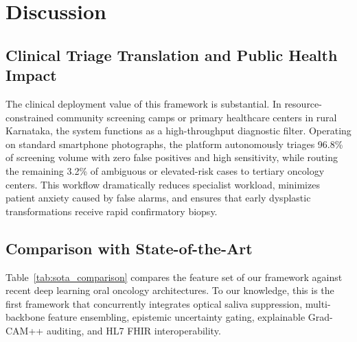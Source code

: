 \documentclass[journal]{IEEEtran}
\begin{document}
\section{Discussion}

\subsection{Clinical Triage Translation and Public Health Impact}
The clinical deployment value of this framework is substantial. In resource-constrained community screening camps or primary healthcare centers in rural Karnataka, the system functions as a high-throughput diagnostic filter. Operating on standard smartphone photographs, the platform autonomously triages 96.8\% of screening volume with zero false positives and high sensitivity, while routing the remaining 3.2\% of ambiguous or elevated-risk cases to tertiary oncology centers. This workflow dramatically reduces specialist workload, minimizes patient anxiety caused by false alarms, and ensures that early dysplastic transformations receive rapid confirmatory biopsy.

\subsection{Comparison with State-of-the-Art}
Table~\ref{tab:sota_comparison} compares the feature set of our framework against recent deep learning oral oncology architectures. To our knowledge, this is the first framework that concurrently integrates optical saliva suppression, multi-backbone feature ensembling, epistemic uncertainty gating, explainable Grad-CAM++ auditing, and HL7 FHIR interoperability.
\end{document}
